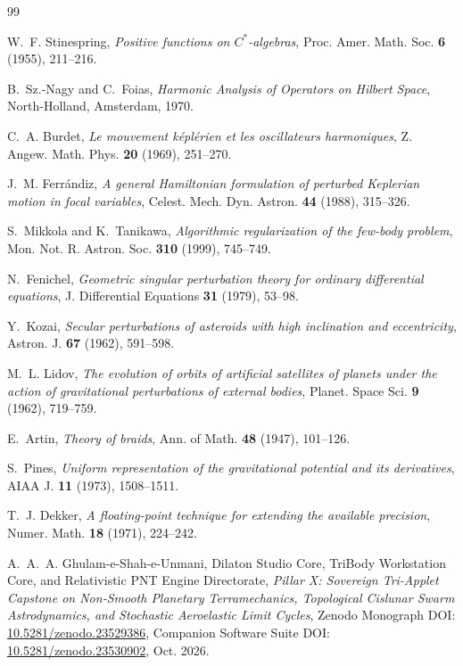 \documentclass[11pt,a4paper,reqno]{article}
\theoremstyle{plain}
\theoremstyle{definition}
\theoremstyle{remark}
\numberwithin{equation}{section}
\begin{document}
\begin{thebibliography}{99}

W.~F. Stinespring,
\emph{Positive functions on $C^*$-algebras},
Proc. Amer. Math. Soc. \textbf{6} (1955), 211--216.

B.~Sz.-Nagy and C.~Foias,
\emph{Harmonic Analysis of Operators on Hilbert Space},
North-Holland, Amsterdam, 1970.

C.~A. Burdet,
\emph{Le mouvement k\'{e}pl\'{e}rien et les oscillateurs harmoniques},
Z. Angew. Math. Phys. \textbf{20} (1969), 251--270.

J.~M. Ferr\'{a}ndiz,
\emph{A general Hamiltonian formulation of perturbed Keplerian motion in focal variables},
Celest. Mech. Dyn. Astron. \textbf{44} (1988), 315--326.

S.~Mikkola and K.~Tanikawa,
\emph{Algorithmic regularization of the few-body problem},
Mon. Not. R. Astron. Soc. \textbf{310} (1999), 745--749.

N.~Fenichel,
\emph{Geometric singular perturbation theory for ordinary differential equations},
J. Differential Equations \textbf{31} (1979), 53--98.

Y.~Kozai,
\emph{Secular perturbations of asteroids with high inclination and eccentricity},
Astron. J. \textbf{67} (1962), 591--598.

M.~L. Lidov,
\emph{The evolution of orbits of artificial satellites of planets under the action of gravitational perturbations of external bodies},
Planet. Space Sci. \textbf{9} (1962), 719--759.

E.~Artin,
\emph{Theory of braids},
Ann. of Math. \textbf{48} (1947), 101--126.

S.~Pines,
\emph{Uniform representation of the gravitational potential and its derivatives},
AIAA J. \textbf{11} (1973), 1508--1511.

T.~J. Dekker,
\emph{A floating-point technique for extending the available precision},
Numer. Math. \textbf{18} (1971), 224--242.

A.~A.~A. Ghulam-e-Shah-e-Unmani, {Dilaton Studio Core}, {TriBody Workstation Core}, and {Relativistic PNT Engine Directorate},
\emph{Pillar X: Sovereign Tri-Applet Capstone on Non-Smooth Planetary Terramechanics, Topological Cislunar Swarm Astrodynamics, and Stochastic Aeroelastic Limit Cycles},
Zenodo Monograph DOI: \href{https://doi.org/10.5281/zenodo.23529386}{10.5281/zenodo.23529386}, Companion Software Suite DOI: \href{https://doi.org/10.5281/zenodo.23530902}{10.5281/zenodo.23530902}, Oct. 2026.


\end{thebibliography}
\end{document}
